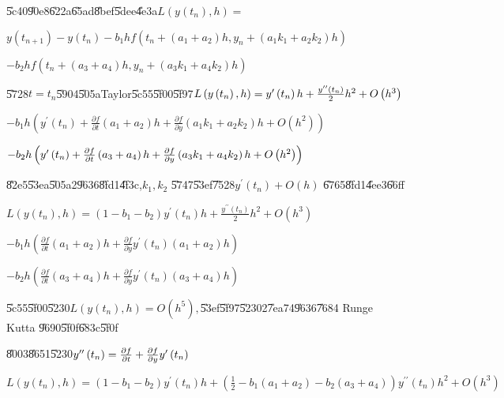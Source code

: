 \documentclass{article}
\begin{document}
\U{5c40}\U{90e8}\U{622a}\U{65ad}\U{8bef}\U{5dee}\U{4e3a}$L\left( y\left(
t_{n}\right) ,h\right) =$

$y\left( t_{n+1}\right) -y\left( t_{n}\right) -b_{1}hf\left( t_{n}+\left(
a_{1}+a_{2}\right) h,y_{n}+\left( a_{1}k_{1}+a_{2}k_{2}\right) h\right) $

$-b_{2}hf\left( t_{n}+\left( a_{3}+a_{4}\right) h,y_{n}+\left(
a_{3}k_{1}+a_{4}k_{2}\right) h\right) $

\U{5728}$t=t_{n}$\U{5904}\U{505a}Taylor\U{5c55}\U{5f00}\U{5f97}$L\left(
y\left( t_{n}\right) ,h\right) =y^{\prime }\left( t_{n}\right) h+\frac{%
y^{\prime \prime }\left( t_{n}\right) }{2}h^{2}+O\left( h^{3}\right) $

$-b_{1}h\left( y^{\prime }\left( t_{n}\right) +\frac{\partial f}{\partial t}%
\left( a_{1}+a_{2}\right) h+\frac{\partial f}{\partial y}\left(
a_{1}k_{1}+a_{2}k_{2}\right) h+O\left( h^{2}\right) \right) $

\bigskip $-b_{2}h\left( y^{\prime }\left( t_{n}\right) +\frac{\partial f}{%
\partial t}\left( a_{3}+a_{4}\right) h+\frac{\partial f}{\partial y}\left(
a_{3}k_{1}+a_{4}k_{2}\right) h+O\left( h^{2}\right) \right) $

\bigskip \U{82e5}\U{53ea}\U{505a}2\U{9636}\U{8fd1}\U{4f3c},$k_{1},k_{2}$%
\U{5747}\U{53ef}\U{7528}$y^{\prime }\left( t_{n}\right) +O\left( h\right) $%
\U{6765}\U{8fd1}\U{4ee3}\U{66ff}

$L\left( y\left( t_{n}\right) ,h\right) =\left( 1-b_{1}-b_{2}\right)
y^{\prime }\left( t_{n}\right) h+\frac{y^{\prime \prime }\left( t_{n}\right) 
}{2}h^{2}+O\left( h^{3}\right) $

$-b_{1}h\left( \frac{\partial f}{\partial t}\left( a_{1}+a_{2}\right) h+%
\frac{\partial f}{\partial y}y^{\prime }\left( t_{n}\right) \left(
a_{1}+a_{2}\right) h\right) $

\bigskip $-b_{2}h\left( \frac{\partial f}{\partial t}\left(
a_{3}+a_{4}\right) h+\frac{\partial f}{\partial y}y^{\prime }\left(
t_{n}\right) \left( a_{3}+a_{4}\right) h\right) $

\bigskip \U{5c55}\U{5f00}\U{5230}$L\left( y\left( t_{n}\right) ,h\right)
=O\left( h^{5}\right) ,$\U{53ef}\U{5f97}\U{5230}2\U{7ea7}4\U{9636}\U{7684}%
Runge Kutta \U{9690}\U{5f0f}\U{683c}\U{5f0f}


\U{8003}\U{8651}\U{5230}$y^{\prime \prime }\left( t_{n}\right) =\frac{%
\partial f}{\partial t}+\frac{\partial f}{\partial y}y^{\prime }\left(
t_{n}\right) $

$L\left( y\left( t_{n}\right) ,h\right) =\left( 1-b_{1}-b_{2}\right)
y^{\prime }\left( t_{n}\right) h+\left( \frac{1}{2}-b_{1}\left(
a_{1}+a_{2}\right) -b_{2}\left( a_{3}+a_{4}\right) \right) y^{\prime \prime
}\left( t_{n}\right) h^{2}+O\left( h^{3}\right) $
\end{document}
